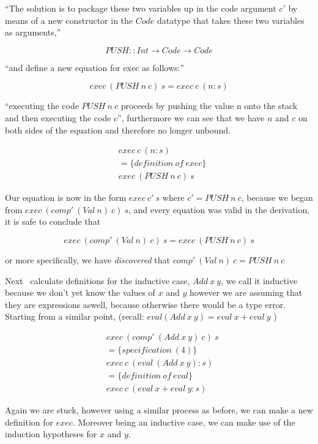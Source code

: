\documentclass {article}
\begin{document}
``The solution is to package these two
variables up in the code argument $c'$
by means of a new constructor in the $Code$ datatype
that takes these two variables as arguments,''

\[ PUSH :: Int \rightarrow Code \rightarrow Code \]

``and define a new equation for exec as follows:''

\[ exec \ (PUSH \ n \ c) \ s = exec \ c \ (n :s) \]

``executing the code $PUSH \ n \ c$ 
proceeds by pushing the value n onto the stack and
then executing the code $c$'', furthermore
we can see that we have $n$ and $c$ on both
sides of the equation and therefore no longer unbound.

\begin{align*}
	&exec \ c \ (n:s) \\
	&= \{definition \ of \ exec\} \\
	&exec \ (PUSH \ n \ c) \ s
\end{align*}

Our equation is now in the form $exec \ c' \ s$
where $c' = PUSH \ n \ c$, 
because we began from 
\(exec \ (comp' \ (Val \ n) \ c) \ s \),
and every equation was valid in the derivation,
it is safe to conclude that 

\[exec \ (comp' \ (Val \ n) \ c) \ s = exec \ (PUSH \ n \ c) \ s\]

or more specifically, we have \emph{discovered} that 
 \( comp' \ (Val \ n) \ c =  PUSH \ n \ c \)

Next \BH\ calculate definitions for the inductive case, 
$Add \ x \ y$,
we call it inductive because we don't yet know 
the values of $x$ and $y$ however we are assuming
that they are expressions aswell,
because otherwise there would be a type error.
Starting from a similar point,
(recall: \( eval (Add \  x \  y) = eval \  x + eval \  y  \) )

\begin{align*}
	&exec \ (comp' \ (Add \ x \ y) \ c) \ s \\
	&= \{specification \ (4) \} \\
	&exec \ c \ (eval \ (Add \ x \ y) : s) \\
	&= \{definition \ of \ eval\} \\
	&exec \ c \ (eval \ x + eval \ y :s)
\end{align*}

Again we are stuck, however using a similar process
as before, we can make a new definition for $exec$.
Moreover being an inductive case, 
we can make use of the induction 
hypotheses for $x$ and $y$\cite{bandh}.
\end{document}

